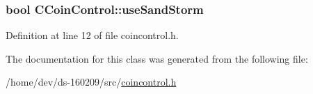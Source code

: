 \subsubsection[{use\+Sand\+Storm}]{\setlength{\rightskip}{0pt plus 5cm}bool C\+Coin\+Control\+::use\+Sand\+Storm}\label{class_c_coin_control_aaf970313b382dbd5ac0076c7765949b7}


Definition at line 12 of file coincontrol.\+h.



The documentation for this class was generated from the following file\+:\begin{DoxyCompactItemize}
\item 
/home/dev/ds-\/160209/src/\hyperlink{coincontrol_8h}{coincontrol.\+h}\end{DoxyCompactItemize}
